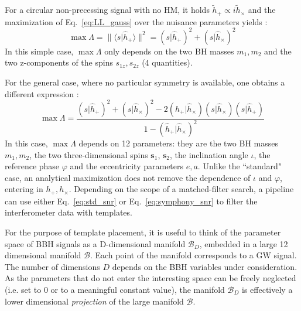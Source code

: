 \documentclass[twocolumn,showpacs,preprintnumbers,nofootinbib,prd,
superscriptaddress,10pt]{revtex4-2}
\newcommand{\scalar}[2]{\langle #1|#2 \rangle}
\newcommand{\rescalar}[2]{( #1 |#2 )}
\begin{document}
For a circular non-precessing signal with no HM, it holds $\tilde{h}_+ \propto i\tilde{h}_\times$ and the maximization of Eq.~\eqref{eq:LL_gauss} over the nuisance parameters yields \cite{Maggiore:2007ulw}:
\begin{equation}\label{eq:std_snr}
	\max \Lambda = \lVert \scalar{s}{\hat{h}_+} \rVert^2 = \rescalar{s}{\hat{h}_+}^2 + \rescalar{s}{\hat{h}_\times}^2
\end{equation}
In this simple case, $\max\Lambda$ only depends on the two BH masses $m_1, m_2$ and the two z-components of the spins $s_{1z}, s_{2z}$ (4 quantities).

For the general case, where no particular symmetry is available, one obtains a different expression \cite{Capano:2013raa, Schmidt:2014iyl, Harry:2017weg}:
\begin{equation}\label{eq:symphony_snr}
	\max \Lambda = \frac{ \rescalar{s}{\hat{h}_+}^2 + \rescalar{s}{\hat{h}_\times}^2 -2\rescalar{\hat{h}_+}{\hat{h}_\times}\rescalar{s}{\hat{h}_\times}\rescalar{s}{\hat{h}_+}}{1- \rescalar{\hat{h}_+}{\hat{h}_\times}^2}
\end{equation}
In this case, $\max\Lambda$ depends on 12 parameters: they are the two BH masses $m_1, m_2$, the two three-dimensional spins $\mathbf{s}_1$, $\mathbf{s}_2$, the inclination angle $\iota$, the reference phase $\varphi$ and the eccentricity parameters $e, a$.
Unlike the ``standard" case, an analytical maximization does not remove the dependence of $\iota$ and $\varphi$, entering in $h_+, h_\times$.
%
Depending on the scope of a matched-filter search, a pipeline can use either Eq.~\eqref{eq:std_snr} or Eq.~\eqref{eq:symphony_snr} to filter the interferometer data with templates.

For the purpose of template placement, it is useful to think of the parameter space of BBH signals as a D-dimensional manifold $\mathcal{B}_D$, embedded in a large 12 dimensional manifold $\mathcal{B}$. Each point of the manifold corresponds to a GW signal. The number of dimensions $D$ depends on the BBH variables under consideration.
As the parameters that do not enter the interesting space can be freely neglected (i.e. set to $0$ or to a meaningful constant value), the manifold $\mathcal{B}_D$ is effectively a lower dimensional {\it projection} of the large manifold $\mathcal{B}$.
\end{document}

